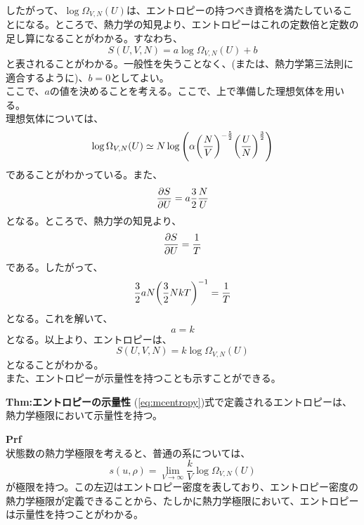 \documentclass[a4paper,11pt]{jsarticle}
\numberwithin{equation}{section}
\begin{document}
したがって、$\log \Omega_{V,N}(U)$は、エントロピーの持つべき資格を満たしていることになる。ところで、熱力学の知見より、エントロピーはこれの定数倍と定数の足し算になることがわかる。すなわち、
\begin{equation}
  S(U,V,N) = a \log \Omega_{V,N}(U) + b
\end{equation}
と表されることがわかる。一般性を失うことなく、(または、熱力学第三法則に適合するように)、$b=0$としてよい。\\
ここで、$a$の値を決めることを考える。ここで、上で準備した理想気体を用いる。\\
理想気体については、
\begin{equation}
  \log \Omega_{V,N}(U) \simeq N\log \qty(\alpha \qty(\frac{N}{V})^{-\frac{5}{2}}\qty(\frac{U}{N})^{\frac{3}{2}})
\end{equation}
であることがわかっている。また、
\begin{equation}
  \pdv{S}{U} = a\frac{3}{2}\frac{N}{U}
\end{equation}
となる。ところで、熱力学の知見より、
\begin{equation}
  \pdv{S}{U} = \frac{1}{T}
\end{equation}
である。したがって、
\begin{equation}
  \frac{3}{2}a N \qty(\frac{3}{2}NkT)^{-1} = \frac{1}{T}
\end{equation}
となる。これを解いて、
\begin{equation}
  a = k
\end{equation}
となる。以上より、エントロピーは、
\begin{equation}
  S(U,V,N) = k \log \Omega_{V,N}(U)
\end{equation}
となることがわかる。\hfill\qedsymbol\\

また、エントロピーが示量性を持つことも示すことができる。\\
\begin{itembox}[l]{\textbf{Thm:エントロピーの示量性}}
  (\ref{eq:mcentropy})式で定義されるエントロピーは、熱力学極限において示量性を持つ。
\end{itembox}
\textbf{Prf}\\
状態数の熱力学極限を考えると、普通の系については、
\begin{equation}
  s(u,\rho) = \lim_{V \rightarrow \infty} \frac{k}{V}\log \Omega_{V,N}(U)
\end{equation}
が極限を持つ。この左辺はエントロピー密度を表しており、エントロピー密度の熱力学極限が定義できることから、たしかに熱力学極限において、エントロピーは示量性を持つことがわかる。\hfill\qedsymbol\\
\end{document}
